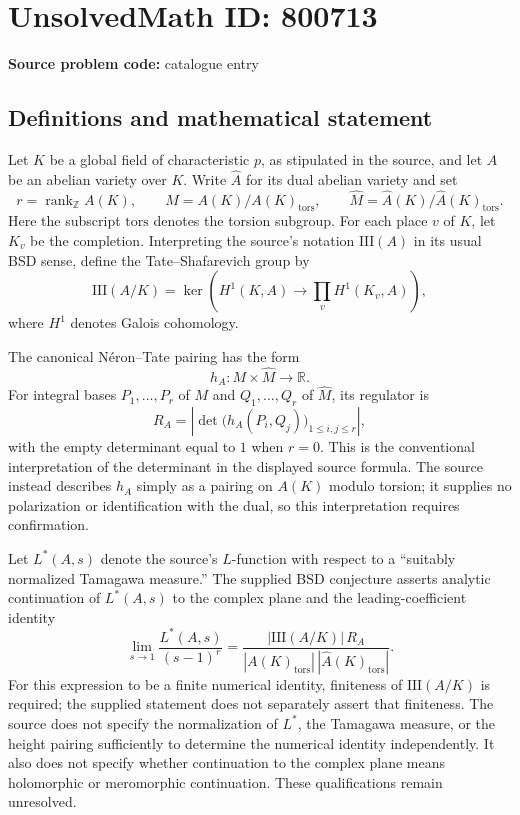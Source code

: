 \documentclass[11pt]{article}
\newcommand{\Z}{\mathbb{Z}}
\newcommand{\R}{\mathbb{R}}
\begin{document}
\section*{UnsolvedMath ID: 800713}
\textbf{Source problem code:} catalogue entry
\subsection{Definitions and mathematical statement}
Let \(K\) be a global field of characteristic \(p\), as stipulated in the source, and let \(A\) be an abelian variety over \(K\). Write \(\hat A\) for its dual abelian variety and set
\[
r=\operatorname{rank}_{\Z} A(K),\qquad
M=A(K)/A(K)_{\mathrm{tors}},\qquad
\hat M=\hat A(K)/\hat A(K)_{\mathrm{tors}}.
\]
Here the subscript \(\mathrm{tors}\) denotes the torsion subgroup. For each place \(v\) of \(K\), let \(K_v\) be the completion. Interpreting the source's notation \(\mathrm{III}(A)\) in its usual BSD sense, define the Tate--Shafarevich group by
\[
\mathrm{III}(A/K)=\ker\!\left(H^1(K,A)\longrightarrow\prod_v H^1(K_v,A)\right),
\]
where \(H^1\) denotes Galois cohomology.

The canonical N\'eron--Tate pairing has the form
\[
h_A:M\times\hat M\longrightarrow\R.
\]
For integral bases \(P_1,\ldots,P_r\) of \(M\) and \(Q_1,\ldots,Q_r\) of \(\hat M\), its regulator is
\[
R_A=\left|\det\bigl(h_A(P_i,Q_j)\bigr)_{1\leq i,j\leq r}\right|,
\]
with the empty determinant equal to \(1\) when \(r=0\). This is the conventional interpretation of the determinant in the displayed source formula. The source instead describes \(h_A\) simply as a pairing on \(A(K)\) modulo torsion; it supplies no polarization or identification with the dual, so this interpretation requires confirmation.

Let \(L^*(A,s)\) denote the source's \(L\)-function with respect to a ``suitably normalized Tamagawa measure.'' The supplied BSD conjecture asserts analytic continuation of \(L^*(A,s)\) to the complex plane and the leading-coefficient identity
\[
\lim_{s\to1}\frac{L^*(A,s)}{(s-1)^r}
=
\frac{|\mathrm{III}(A/K)|\,R_A}
{|A(K)_{\mathrm{tors}}|\,|\hat A(K)_{\mathrm{tors}}|}.
\]
For this expression to be a finite numerical identity, finiteness of \(\mathrm{III}(A/K)\) is required; the supplied statement does not separately assert that finiteness. The source does not specify the normalization of \(L^*\), the Tamagawa measure, or the height pairing sufficiently to determine the numerical identity independently. It also does not specify whether continuation to the complex plane means holomorphic or meromorphic continuation. These qualifications remain unresolved.
\end{document}
